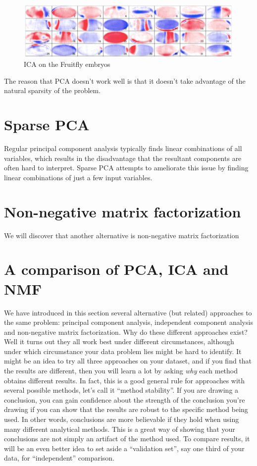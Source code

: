 \begin{figure}[H]
\begin{center}
\includegraphics[scale=0.4]{ica_embryo.png}
\end{center}
\caption{ICA on the Fruitfly embryos}
\label{fig:fruitfly_ica}
\end{figure}

The reason that PCA doesn't work well is that it doesn't take advantage of the natural sparsity of the problem.

\section{Sparse PCA}

Regular principal component analysis typically finds linear combinations of all variables, which results in the disadvantage that the resultant components are often hard to interpret. Sparse PCA attempts to ameliorate this issue by finding linear combinations of just a few input variables.


\section{Non-negative matrix factorization}

We will discover that another alternative is non-negative matrix factorization


\section{A comparison of PCA, ICA and NMF}

We have introduced in this section several alternative (but related) approaches to the same problem: principal component analysis, independent component analysis and non-negative matrix factorization. Why do these different approaches exist? Well it turns out they all work best under different circumstances, although under which circumstance your data problem lies might be hard to identify. It might be an idea to try all three approaches on your dataset, and if you find that the results are different, then you will learn a lot by asking \emph{why} each method obtains different results. In fact, this is a good general rule for approaches with several possible methods, let's call it ``method stability''. If you are drawing a conclusion, you can gain confidence about the strength of the conclusion you're drawing if you can show that the results are robust to the specific method being used. In other words, conclusions are more believable if they hold when using many different analytical methods. This is a great way of showing that your conclusions are not simply an artifact of the method used. To compare results, it will be an even better idea to set aside a ``validation set'', say one third of your data, for ``independent'' comparison.

